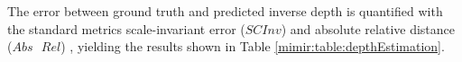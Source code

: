 The error between ground truth and predicted inverse depth is quantified with the standard metrics scale-invariant error ($SCInv$) and absolute relative distance ($Abs\text{ }Rel$) \cite{depthMetricscaleeigensplit}, yielding the results shown in Table \ref{mimir:table:depthEstimation}. 
